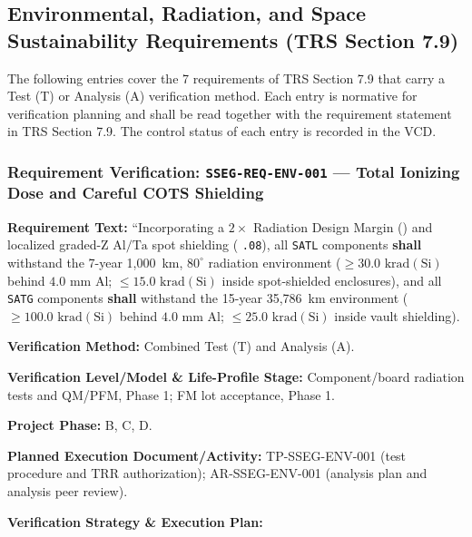 \subsection{Environmental, Radiation, and Space Sustainability Requirements (TRS Section 7.9)}
The following entries cover the 7 requirements of TRS Section 7.9 that carry a Test (T) or Analysis (A) verification method. Each entry is normative for verification planning and shall be read together with the requirement statement in TRS Section 7.9. The control status of each entry is recorded in the VCD.
\subsubsection{Requirement Verification: \texttt{SSEG-REQ-ENV-001} --- Total Ionizing Dose and Careful COTS Shielding}
\label{ver:SSEG-REQ-ENV-001}
\textbf{Requirement Text:} ``Incorporating a $2\times$ Radiation Design Margin () and localized graded-Z $\mathrm{Al}/\mathrm{Ta}$ spot shielding ( \texttt{.08}), all \texttt{SATL} components \textbf{shall} withstand the 7-year 1,000~km, $80^\circ$ radiation environment ($\ge 30.0\text{ krad}(\mathrm{Si})$ behind $4.0\text{ mm}$ $\mathrm{Al}$; $\le 15.0\text{ krad}(\mathrm{Si})$ inside spot-shielded enclosures), and all \texttt{SATG} components \textbf{shall} withstand the 15-year 35,786~km  environment ($\ge 100.0\text{ krad}(\mathrm{Si})$ behind $4.0\text{ mm}$ $\mathrm{Al}$; $\le 25.0\text{ krad}(\mathrm{Si})$ inside vault shielding).
\par\textbf{Verification Method:} Combined Test (T) and Analysis (A).
\par\textbf{Verification Level/Model \& Life-Profile Stage:} Component/board radiation tests and QM/PFM, Phase 1; FM lot acceptance, Phase 1.
\par\textbf{Project Phase:} B, C, D.
\par\textbf{Planned Execution Document/Activity:} TP-SSEG-ENV-001 (test procedure and TRR authorization); AR-SSEG-ENV-001 (analysis plan and analysis peer review).
\par\textbf{Verification Strategy \& Execution Plan:}
